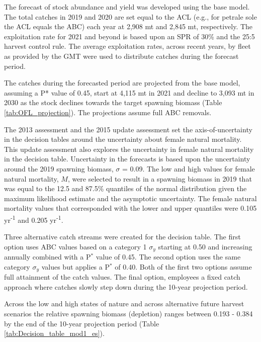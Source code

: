 \documentclass[12pt,]{article}
\begin{document}
The forecast of stock abundance and yield was developed using the base
model. The total catches in 2019 and 2020 are set equal to the ACL
(e.g., for petrale sole the ACL equals the ABC) each year at 2,908 mt
and 2,845 mt, respectively. The exploitation rate for 2021 and beyond is
based upon an SPR of 30\% and the 25:5 harvest control rule. The average
exploitation rates, across recent years, by fleet as provided by the GMT
were used to distribute catches during the forecast period.

The catches during the forecasted period are projected from the base
model, assuming a P* value of 0.45, start at 4,115 mt in 2021 and
decline to 3,093 mt in 2030 as the stock declines towards the target
spawning biomass (Table \ref{tab:OFL_projection}). The projections
assume full ABC removals.

The 2013 assessment and the 2015 update assessment set the
axis-of-uncertainty in the decision tables around the uncertainty about
female natural mortality. This update assessment also explores the
uncertainty in female natural mortality in the decision table.
Uncertainty in the forecasts is based upon the uncertainty around the
2019 spawning biomass, \(\sigma\) = 0.09. The low and high values for
female natural mortality, \(M\), were selected to result in a spawning
biomass in 2019 that was equal to the 12.5 and 87.5\% quantiles of the
normal distribution given the maximum likelihood estimate and the
asymptotic uncertainty. The female natural mortality values that
corresponded with the lower and upper quantiles were 0.105
yr\textsuperscript{-1} and 0.205 yr\textsuperscript{-1}.

Three alternative catch streams were created for the decision table. The
first option uses ABC values based on a category 1 \(\sigma_y\) starting
at 0.50 and increasing annually combined with a P\(^*\) value of 0.45.
The second option uses the same category \(\sigma_y\) values but applies
a P\(^*\) of 0.40. Both of the first two options assume full attainment
of the catch values. The final option, employees a fixed catch approach
where catches slowly step down during the 10-year projection period.

Across the low and high states of nature and across alternative future
harvest scenarios the relative spawning biomass (depletion) ranges
between 0.193 - 0.384 by the end of the 10-year projection period (Table
\ref{tab:Decision_table_mod1_es}).
\end{document}
